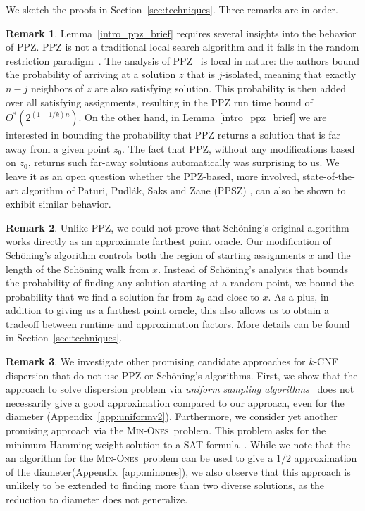 \documentclass[11pt, letterpaper]{article}
\theoremstyle{definition}
\newtheorem{remark}{Remark}
\newcommand{\minones}{\textsc{Min-Ones}\xspace}
\newcommand{\Sch}{Sch\"{o}ning\xspace}
\begin{document}
\vspace{1mm}We sketch the proofs in Section~\ref{sec:techniques}. Three remarks are in order.


\begin{remark}
Lemma~\ref{intro_ppz_brief} requires several insights into the behavior of PPZ. PPZ is not a traditional local search algorithm and it falls in the random restriction paradigm~\cite{scheder2022ppsz}. The analysis of PPZ~\cite{PPZ} is local in nature: the authors bound the probability of arriving at a solution $z$ that is $j$-isolated, meaning that exactly $n-j$ neighbors of $z$ are also satisfying solution. This probability is then added over all satisfying assignments, resulting in the PPZ run time bound of $O^*(2^{(1-1/k)n})$. On the other hand, in Lemma~\ref{intro_ppz_brief} we are interested in bounding the probability that PPZ returns a solution that is far away from a given point $z_0$. The fact that PPZ, without any modifications based on $z_0$, returns such far-away solutions automatically was surprising to us.  We leave it as an open question whether the PPZ-based, more involved, state-of-the-art algorithm of Paturi, Pudl\'ak, Saks and Zane (PPSZ) \cite{paturi2005}, can also be shown to exhibit similar behavior.
\end{remark}

\begin{remark}
Unlike PPZ, we could not prove that Sch\"{o}ning's original algorithm works directly as an approximate farthest point oracle. Our modification of Sch\"{o}ning's algorithm controls both the region of starting assignments $x$ and the length of the Sch\"{o}ning walk from $x$. Instead of Sch\"{o}ning's analysis that bounds the probability of finding any solution starting at a random point, we bound the probability that we find a solution far from $z_0$ and close to $x$. As a plus, in addition to giving us a farthest point oracle, this also allows us to obtain a tradeoff between runtime and approximation factors. More details can be found in Section~\ref{sec:techniques}.
\end{remark}

\begin{remark} 
We investigate other promising candidate approaches for $k$-CNF dispersion that do not use PPZ or \Sch's algorithms.  
First, we show that the approach to solve dispersion problem via  \emph{uniform sampling algorithms}~\cite{schmitt2013exploiting} does not necessarily give a good approximation compared to our approach, even for the diameter (Appendix~\ref{app:uniformv2}).  Furthermore, we consider yet another promising approach via the \minones\ problem.  This problem asks for the minimum Hamming weight solution to a SAT formula~\cite{ConicSearch}. While we note that the an algorithm for the \minones\ problem can be used to give a $1/2$ approximation of the diameter(Appendix~\ref{app:minones}), we also observe that this approach is unlikely to be extended to finding more than two diverse solutions, as the reduction to diameter does not generalize.
\end{remark}
\end{document}
